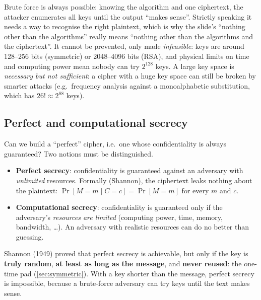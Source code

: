 \begin{remark}
Brute force is always possible: knowing the algorithm and one ciphertext, the attacker enumerates all keys until the output \enquote{makes sense}. Strictly speaking it needs a way to recognise the right plaintext, which is why the slide's \enquote{nothing other than the algorithms} really means \enquote{nothing other than the algorithms and the ciphertext}. It cannot be prevented, only made \emph{infeasible}: keys are around 128--256 bits (symmetric) or 2048--4096 bits (RSA), and physical limits on time and computing power mean nobody can try $2^{128}$ keys. A large key space is \emph{necessary but not sufficient}: a cipher with a huge key space can still be broken by smarter attacks (e.g.\ frequency analysis against a monoalphabetic substitution, which has $26! \approx 2^{88}$ keys).
\end{remark}

\subsection{Perfect and computational secrecy}

Can we build a \enquote{perfect} cipher, i.e.\ one whose confidentiality is always guaranteed? Two notions must be distinguished.

\begin{definition}
\leavevmode
\begin{itemize}
    \item \textbf{Perfect secrecy}: confidentiality is guaranteed against an adversary with \emph{unlimited} resources. Formally (Shannon), the ciphertext leaks nothing about the plaintext: $\Pr[M = m \mid C = c] = \Pr[M = m]$ for every $m$ and $c$.
    \item \textbf{Computational secrecy}: confidentiality is guaranteed only if the adversary's \emph{resources are limited} (computing power, time, memory, bandwidth, \dots). An adversary with realistic resources can do no better than guessing.
\end{itemize}
\end{definition}

Shannon (1949) proved that perfect secrecy is achievable, but only if the key is \textbf{truly random}, \textbf{at least as long as the message}, and \textbf{never reused}: the one-time pad (\cref{sec:symmetric}). With a key shorter than the message, perfect secrecy is impossible, because a brute-force adversary can try keys until the text makes sense.

